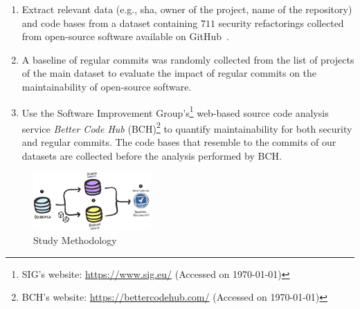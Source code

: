\documentclass[sigconf,review]{acmart}
\begin{document}
\begin{enumerate}
	\item Extract relevant data (e.g., sha, owner of the project, name of 
	the repository) and code bases from a dataset containing $711$ security
	refactorings collected from open-source software available on
	GitHub~\cite{Reis:2017:IJSSE}.
	\item A baseline of regular commits was randomly collected from the list of
	projects of the main dataset to evaluate the impact of regular commits on the
	maintainability of open-source software.
  \item Use the Software Improvement Group's\footnote{SIG's website: \url{https://www.sig.eu/} 
  (Accessed on \today{})} web-based source code analysis
  service \emph{Better Code Hub} (BCH)\footnote{BCH's website:
  \url{https://bettercodehub.com/} (Accessed on \today{})} to quantify maintainability
  for both security and regular commits. The code bases that resemble to the commits
  of our datasets are collected before the analysis performed by BCH.
  
\end{enumerate}
\vspace{-0.3cm}

%
\begin{figure}[h]
 	\centering 	\includegraphics[width=0.4\textwidth]{figures/methodology.pdf}
 	\caption{Study Methodology}
	\label{fig:met}
	
\end{figure}
	\vspace{-0.2cm}

%
\end{document}

